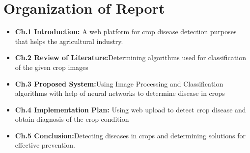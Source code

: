%
\section{Organization of Report}
\begin{itemize}
\item \textbf{Ch.1 Introduction:} A web platform for crop disease detection purposes that helps the agricultural industry.
\item \textbf{Ch.2 Review of Literature:}Determining algorithms used for classification of the given crop images
\item \textbf{Ch.3 Proposed System:}Using Image Processing and Classification algorithms with help of neural networks to determine disease in crops
\item \textbf{Ch.4 Implementation Plan:} Using web upload to detect crop disease and obtain diagnosis of the crop condition
\item \textbf{Ch.5 Conclusion:}Detecting diseases in crops and determining solutions for effective prevention.

\end{itemize}
%
